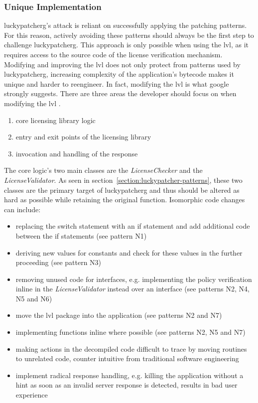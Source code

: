 \subsubsection{Unique Implementation} \label{subsection:counter-modifications-library}
\gls{luckypatcherg}'s attack is reliant on successfully applying the patching patterns.
For this reason, actively avoiding these patterns should always be the first step to challenge \gls{luckypatcherg}.
This approach is only possible when using the \gls{lvl}, as it requires access to the source code of the license verification mechanism.
Modifying and improving the \gls{lvl} does not only protect from patterns used by \gls{luckypatcherg}, increasing complexity of the application's bytecode makes it unique and harder to reengineer.
In fact, modifying the lvl is what google strongly suggests.\cite{developersSecuring}
\newline
There are three areas the developer should focus on when modifying the \gls{lvl}  \cite{developersSecuring}.
\begin{enumerate}
\item core licensing library logic
\item entry and exit points of the licensing library
\item invocation and handling of the response
\end{enumerate}
The core logic’s two main classes are the \textit{LicenseChecker} and the \textit{LicenseValidator}.
As seen in section~\ref{section:luckypatcher-patterns}, these two classes are the primary target of \gls{luckypatcherg} and thus should be altered as hard as possible while retaining the original function.
Isomorphic code changes can include:
\begin{itemize}
\item replacing the switch statement with an if statement and add additional code between the if statements (see pattern N1)
\item deriving new values for constants and check for these values in the further proceeding (see pattern N3)
\item removing unused code for interfaces, e.g. implementing the policy verification inline in the \textit{LicenseValidator} instead over an interface (see patterns N2, N4, N5 and N6)
\item move the \gls{lvl} package into the application (see patterns N2 and N7)
\item implementing functions inline where possible (see patterns N2, N5 and N7)
\item making actions in the decompiled code difficult to trace by moving routines to unrelated code, counter intuitive from traditional software engineering
\item implement radical response handling, e.g. killing the application without a hint as soon as an invalid server response is detected, results in bad user experience
\end{itemize}
